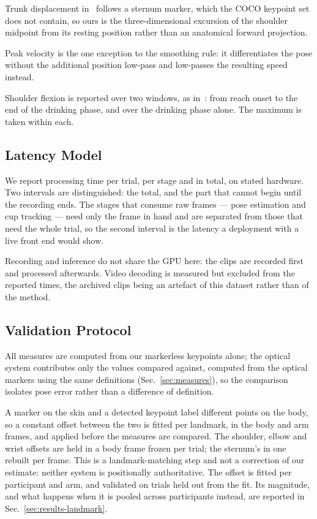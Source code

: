 \documentclass[conference]{IEEEtran}
\begin{document}
Trunk displacement in~\cite{unger2024} follows a sternum marker, which the COCO
keypoint set does not contain, so ours is the three-dimensional excursion of the
shoulder midpoint from its resting position rather than an anatomical forward
projection.

Peak velocity is the one exception to the smoothing rule: it differentiates the
pose without the additional position low-pass and low-passes the resulting
speed instead.

Shoulder flexion is reported over two windows, as in~\cite{unger2024}: from
reach onset to the end of the drinking phase, and over the drinking phase alone.
The maximum is taken within each.

\subsection{Latency Model}
\label{sec:latency}
We report processing time per trial, per stage and in total, on stated hardware.
Two intervals are distinguished: the total, and the
part that cannot begin until the recording ends. The stages that consume raw
frames --- pose estimation and cup tracking --- need only the frame in hand and
are separated from those that need the whole trial, so the second interval is
the latency a deployment with a live front end would show.

Recording and inference do not share the GPU here: the clips are recorded first
and processed afterwards. Video decoding is measured but excluded from the
reported times, the archived clips being an artefact of this dataset rather than
of the method.

\subsection{Validation Protocol}
\label{sec:validation}
All measures are computed from our markerless keypoints alone; the optical
system contributes only the values compared against, computed from the optical
markers using the same definitions (Sec.~\ref{sec:measures}), so the comparison
isolates pose error rather than a difference of definition.

A marker on the skin and a detected keypoint label different points on the body,
so a constant offset between the two is fitted per landmark, in the body and arm
frames, and applied before the measures are compared. The shoulder, elbow and
wrist offsets are held in a body frame frozen per trial; the sternum's in one
rebuilt per frame. This is a landmark-matching
step and not a correction of our estimate: neither system is positionally
authoritative. The offset is fitted per participant and arm, and validated on
trials held out from the fit. Its magnitude, and what happens when it is pooled
across participants instead, are reported in
Sec.~\ref{sec:results-landmark}.
\end{document}
